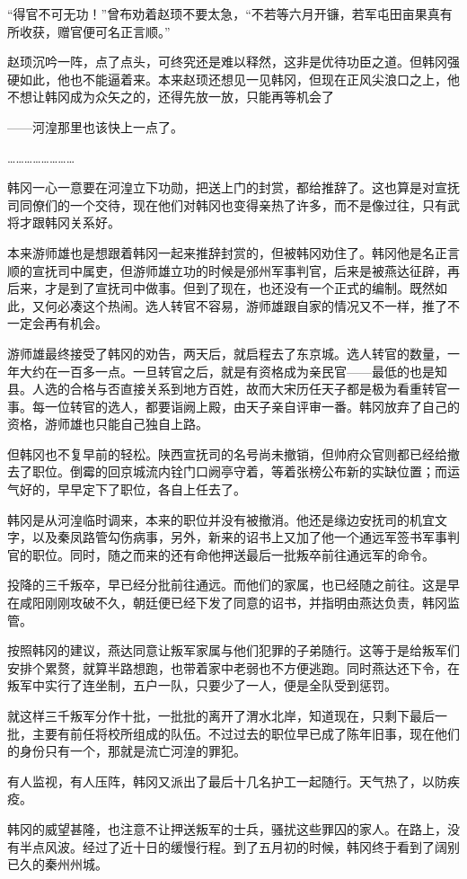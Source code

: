 “得官不可无功！”曾布劝着赵顼不要太急，“不若等六月开镰，若军屯田亩果真有所收获，赠官便可名正言顺。”

赵顼沉吟一阵，点了点头，可终究还是难以释然，这非是优待功臣之道。但韩冈强硬如此，他也不能逼着来。本来赵顼还想见一见韩冈，但现在正风尖浪口之上，他不想让韩冈成为众矢之的，还得先放一放，只能再等机会了

——河湟那里也该快上一点了。

……………………

韩冈一心一意要在河湟立下功勋，把送上门的封赏，都给推辞了。这也算是对宣抚司同僚们的一个交待，现在他们对韩冈也变得亲热了许多，而不是像过往，只有武将才跟韩冈关系好。

本来游师雄也是想跟着韩冈一起来推辞封赏的，但被韩冈劝住了。韩冈他是名正言顺的宣抚司中属吏，但游师雄立功的时候是邠州军事判官，后来是被燕达征辟，再后来，才是到了宣抚司中做事。但到了现在，也还没有一个正式的编制。既然如此，又何必凑这个热闹。选人转官不容易，游师雄跟自家的情况又不一样，推了不一定会再有机会。

游师雄最终接受了韩冈的劝告，两天后，就启程去了东京城。选人转官的数量，一年大约在一百多一点。一旦转官之后，就是有资格成为亲民官——最低的也是知县。人选的合格与否直接关系到地方百姓，故而大宋历任天子都是极为看重转官一事。每一位转官的选人，都要诣阙上殿，由天子亲自评审一番。韩冈放弃了自己的资格，游师雄也只能自己独自上路。

但韩冈也不复早前的轻松。陕西宣抚司的名号尚未撤销，但帅府众官则都已经给撤去了职位。倒霉的回京城流内铨门口阙亭守着，等着张榜公布新的实缺位置；而运气好的，早早定下了职位，各自上任去了。

韩冈是从河湟临时调来，本来的职位并没有被撤消。他还是缘边安抚司的机宜文字，以及秦凤路管勾伤病事，另外，新来的诏书上又加了他一个通远军签书军事判官的职位。同时，随之而来的还有命他押送最后一批叛卒前往通远军的命令。

投降的三千叛卒，早已经分批前往通远。而他们的家属，也已经随之前往。这是早在咸阳刚刚攻破不久，朝廷便已经下发了同意的诏书，并指明由燕达负责，韩冈监管。

按照韩冈的建议，燕达同意让叛军家属与他们犯罪的子弟随行。这等于是给叛军们安排个累赘，就算半路想跑，也带着家中老弱也不方便逃跑。同时燕达还下令，在叛军中实行了连坐制，五户一队，只要少了一人，便是全队受到惩罚。

就这样三千叛军分作十批，一批批的离开了渭水北岸，知道现在，只剩下最后一批，主要有前任将校所组成的队伍。不过过去的职位早已成了陈年旧事，现在他们的身份只有一个，那就是流亡河湟的罪犯。

有人监视，有人压阵，韩冈又派出了最后十几名护工一起随行。天气热了，以防疾疫。

韩冈的威望甚隆，也注意不让押送叛军的士兵，骚扰这些罪囚的家人。在路上，没有半点风波。经过了近十日的缓慢行程。到了五月初的时候，韩冈终于看到了阔别已久的秦州州城。

